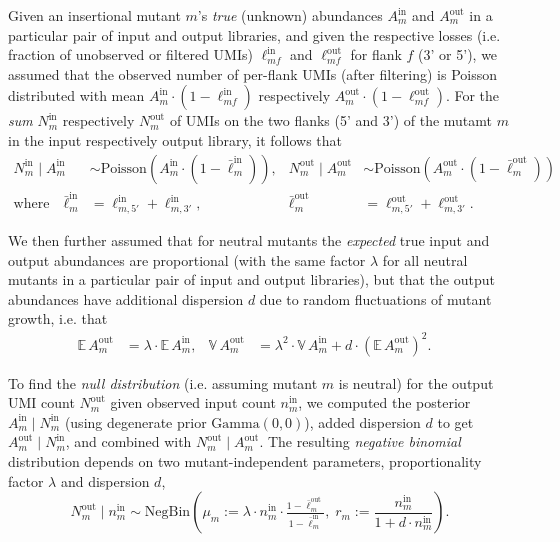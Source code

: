 \documentclass[a4paper,11pt,oneside]{amsart}
\begin{document}
Given an insertional mutant $m$'s \emph{true} (unknown) abundances $A^\text{in}_{m}$ and $A^\text{out}_{m}$ in a particular pair of input and output libraries, and given the respective losses (i.e. fraction of unobserved or filtered UMIs) $\ell^\text{in}_{mf}$ and $\ell^\text{out}_{mf}$ for flank $f$ (3' or 5'), we assumed that the observed number of per-flank UMIs (after filtering) is Poisson distributed with mean $A^\text{in}_{m}\cdot(1-\ell^\text{in}_{mf})$ respectively $A^\text{out}_{m}\cdot(1-\ell^\text{out}_{mf})$.  For the \emph{sum} $N^\text{in}_m$ respectively $N^\text{out}_m$ of UMIs on the two flanks (5' and 3') of the mutamt $m$ in the input respectively output library, it follows that
\begin{align}\label{eq-model}
  N^\text{in}_m\;\big|\;A^\text{in}_{m} &\sim \text{Poisson}\left(A^\text{in}_{m}\cdot(1-\bar\ell^\text{in}_m)\right), &
  N^\text{out}_m\;\big|\;A^\text{out}_{m} &\sim \text{Poisson}\left(A^\text{out}_{m}\cdot(1-\bar\ell^\text{out}_m)\right) \\
  \text{where}\quad
  \bar\ell^\text{in}_m &= \ell^\text{in}_{m,5'} + \ell^\text{in}_{m,3'}, &
  \bar\ell^\text{out}_m &= \ell^\text{out}_{m,5'} + \ell^\text{out}_{m,3'}. \nonumber
\end{align} 

We then further assumed that for neutral mutants the \emph{expected} true input and output abundances are proportional (with the same factor $\lambda$ for all neutral mutants in a particular pair of input and output libraries), but that the output abundances have additional dispersion $d$ due to random fluctuations of mutant growth, i.e. that
\begin{align}\label{eq-a_out}
  \mathbb{E}\, A^\text{out}_m &= \lambda\cdot \mathbb{E}\, A^\text{in}_m, &
  \mathbb{V}\, A^\text{out}_m &= \lambda^2\cdot \mathbb{V}\, A^\text{in}_m + d\cdot\left(\mathbb{E}\, A^\text{out}_m\right)^2.&
\end{align}

To find the \emph{null distribution} (i.e. assuming mutant $m$ is neutral) for the output UMI count $N^\text{out}_m$ given observed input count $n^\text{in}_m$, we computed the posterior $A^\text{in}_{m}\;|\;N^\text{in}_m$ (using degenerate prior $\text{Gamma}(0,0)$), added dispersion $d$ to get $A^\text{out}_{m}\;|\;N^\text{in}_m$, and combined with $N^\text{out}_m\;\big|\;A^\text{out}_{m}$. The resulting \emph{negative binomial} distribution depends on two mutant-independent parameters, proportionality factor $\lambda$ and dispersion $d$,
\begin{equation}\label{eq-n_out-dist}
  N^\text{out}_m\;\big|\;n^\text{in}_{m} \sim
  \text{NegBin}\left(\mu_m := \lambda\cdot n^\text{in}_{m}\cdot\tfrac{1-\bar\ell^\text{out}_m}{1-\bar\ell^\text{in}_m},\;
                     r_m := \frac{n^\text{in}_{m}}{1 + d\cdot n^\text{in}_{m}}\right).
\end{equation}
\end{document}
